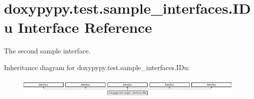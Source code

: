 \hypertarget{classdoxypypy_1_1test_1_1sample__interfaces_1_1_i_du}{\section{doxypypy.\-test.\-sample\-\_\-interfaces.\-I\-Du Interface Reference}
\label{classdoxypypy_1_1test_1_1sample__interfaces_1_1_i_du}
}


The second sample interface.  


Inheritance diagram for doxypypy.\-test.\-sample\-\_\-interfaces.\-I\-Du\-:\begin{figure}[H]
\begin{center}
\leavevmode
\includegraphics[height=0.986784cm]{classdoxypypy_1_1test_1_1sample__interfaces_1_1_i_du}
\end{center}
\end{figure}
